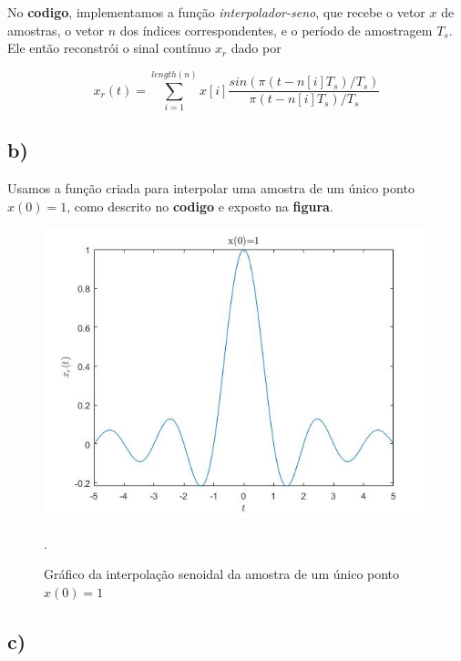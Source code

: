 \documentclass[a4paper, 12pt]{article}
\begin{document}
No \textbf{codigo}, implementamos a função \textit{interpolador-seno}, que recebe o vetor $x$ de amostras, o vetor $n$ dos índices correspondentes, e o período de amostragem $T_s$. Ele então reconstrói o sinal contínuo $x_r$ dado por

$$x_r(t) = \sum_{i=1}^{length(n)}x[i]\frac{sin(\pi (t - n[i]T_s)/T_s)}{\pi (t - n[i]T_s)/T_s}$$ 



\subsection{b)}

Usamos a função criada para interpolar uma amostra de um único ponto $x(0)=1$, como descrito no \textbf{codigo} e exposto na \textbf{figura}.



\begin{figure}[H]
	\centering
	\includegraphics[scale=0.6]{../Imagens/ex6/b.jpg} 
	\caption{Gráfico da interpolação senoidal da amostra de um único ponto $x(0)=1$}.
	\label{fig:1a}
\end{figure}

\subsection{c)}
\end{document}
